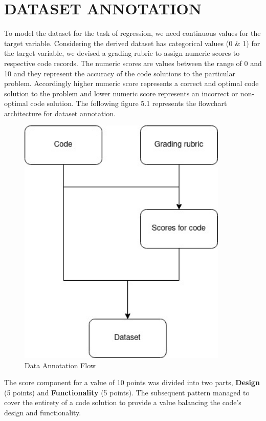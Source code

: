 \section{DATASET ANNOTATION}

To model the dataset for the task of regression, we need continuous values for the target variable. Considering the derived dataset has categorical values (0 \& 1) for the target variable, we devised a grading rubric to assign numeric scores to respective code records. The numeric scores are values between the range of 0 and 10 and they represent the accuracy of the code solutions to the particular problem. Accordingly higher numeric score represents a correct and optimal code solution to the problem and lower numeric score represents an incorrect or non-optimal code solution. The following figure 5.1 represents the flowchart architecture for dataset annotation. 

\begin{figure}[h]
\centering
\includegraphics[height=12cm]{./figures/data.png}
\caption{Data Annotation Flow}
\label{fig1}
\end{figure}

The score component for a value of 10 points was divided into two parts, \textbf{Design} (5 points) and \textbf{Functionality} (5 points). The subsequent pattern managed to cover the entirety of a code solution to provide a value balancing the code's design and functionality. 


